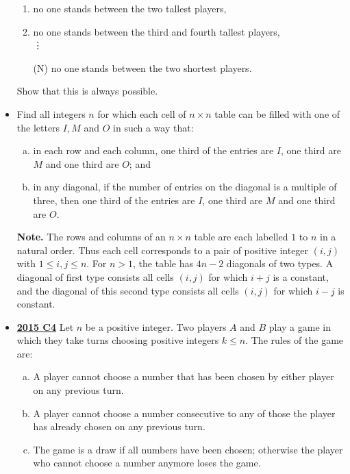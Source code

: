 \documentclass[11pt]{scrartcl}
\begin{document}
\begin{itemize}[leftmargin=*]
\begin{enumerate}[(1)]
    \item no one stands between the two tallest players,
    \item no one stands between the third and fourth tallest players,\\
    \vdots
    \item[(N)]  no one stands between the two shortest players.
\end{enumerate}

Show that this is always possible. 

\newpage

\item {}  Find all integers $n$ for which each cell of $n \times n$ table can be filled with one of the letters $I,M$ and $O$ in such a way that:
\begin{enumerate}[(a)]
    \item  in each row and each column, one third of the entries are $I$, one third are $M$ and one third are $O$; and 
\item  in any diagonal, if the number of entries on the diagonal is a multiple of three, then one third of the entries are $I$, one third are $M$ and one third are $O$.
\end{enumerate}
\textbf{Note.} The rows and columns of an $n \times n$ table are each labelled $1$ to $n$ in a natural order. Thus each cell corresponds to a pair of positive integer $(i,j)$ with $1 \leqslant i,j \leqslant n$. For $n>1$, the table has $4n-2$ diagonals of two types. A diagonal of first type consists all cells $(i,j)$ for which $i+j$ is a constant, and the diagonal of this second type consists all cells $(i,j)$ for which $i-j$ is constant. 
\item \href{https://artofproblemsolving.com/community/c6h1268903p6622756}{\textbf{2015 C4}} Let $n$ be a positive integer. Two players $A$ and $B$ play a game in which they take turns choosing positive integers $k \leqslant n$. The rules of the game are:
\begin{enumerate}[(a)]
    \item A player cannot choose a number that has been chosen by either player on any previous turn.
\item A player cannot choose a number consecutive to any of those the player has already chosen on any previous turn.
\item The game is a draw if all numbers have been chosen; otherwise the player who cannot choose a number anymore loses the game.

\end{enumerate}
\end{itemize}
\end{document}
